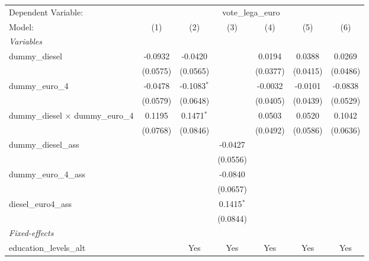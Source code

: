 \begingroup
\centering
\begin{tabular}{lcccccc}
   \tabularnewline \midrule \midrule
   Dependent Variable: & \multicolumn{6}{c}{vote\_lega\_euro}\\
   Model:                                    & (1)      & (2)           & (3)          & (4)      & (5)      & (6)\\  
   \midrule
   \emph{Variables}\\
   dummy\_diesel                             & -0.0932  & -0.0420       &              & 0.0194   & 0.0388   & 0.0269\\   
                                             & (0.0575) & (0.0565)      &              & (0.0377) & (0.0415) & (0.0486)\\   
   dummy\_euro\_4                            & -0.0478  & -0.1083$^{*}$ &              & -0.0032  & -0.0101  & -0.0838\\   
                                             & (0.0579) & (0.0648)      &              & (0.0405) & (0.0439) & (0.0529)\\   
   dummy\_diesel $\times$ dummy\_euro\_4     & 0.1195   & 0.1471$^{*}$  &              & 0.0503   & 0.0520   & 0.1042\\   
                                             & (0.0768) & (0.0846)      &              & (0.0492) & (0.0586) & (0.0636)\\   
   dummy\_diesel\_ass                        &          &               & -0.0427      &          &          &   \\   
                                             &          &               & (0.0556)     &          &          &   \\   
   dummy\_euro\_4\_ass                       &          &               & -0.0840      &          &          &   \\   
                                             &          &               & (0.0657)     &          &          &   \\   
   diesel\_euro4\_ass                        &          &               & 0.1415$^{*}$ &          &          &   \\   
                                             &          &               & (0.0844)     &          &          &   \\   
   \midrule
   \emph{Fixed-effects}\\
   education\_levels\_alt                    &          & Yes           & Yes          & Yes      & Yes      & Yes\\  

\end{tabular}

